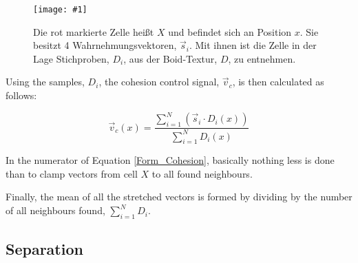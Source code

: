 \documentclass[a4paper, 10pt, journal]{wissarbIEEE}      %
\newcommand{\bild}[3]{
\begin{figure}[h]
\centering
  \texttt{[image: \#1]}
  \caption{#3}
  \label{#1}
\end{figure}}
\begin{document}
\bild{bilder/ChesionAbb}{3cm}{Die rot markierte Zelle heißt $X$ und befindet sich an Position $x$. Sie besitzt 4 Wahrnehmungsvektoren, $\vec{s}_i$. Mit ihnen ist die Zelle in der Lage Stichproben, $D_i$, aus der Boid-Textur, $D$, zu entnehmen.}


Using the samples, $D_i$, the cohesion control signal, $\vec{v}_c$, is then calculated as follows:


\begin{equation}
\vec{v}_c(x) = \frac{\sum_{i=1}^N( \vec{s}_i \cdot D_i(x))}{\sum_{i=1}^N D_i(x)}
\label{Form_Cohesion}
\end{equation}


In the numerator of Equation \ref{Form_Cohesion}, basically nothing less is done than to clamp vectors from cell $X$ to all found neighbours.



Finally, the mean of all the stretched vectors is formed by dividing by the number of all neighbours found, $\sum_{i=1}^N D_i$.



\subsection{Separation}
\end{document}
